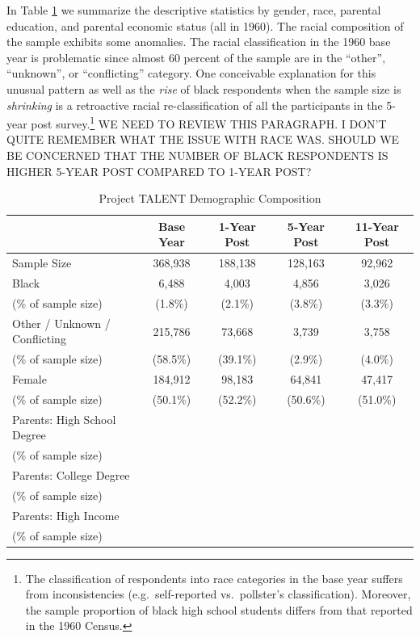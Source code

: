 \documentclass[onehalfspacing,11pt]{article}
\begin{document}
In Table \ref{tab:samplebywave} we summarize the descriptive statistics by gender, race, parental education, and parental economic status (all in 1960). The racial composition of the sample exhibits some anomalies. The racial classification in the 1960 base year is problematic since almost 60 percent of the sample are in the ``other'', ``unknown'', or ``conflicting'' category. One conceivable explanation for this unusual pattern as well as the {\it rise} of black respondents when the sample size is {\it shrinking} is a retroactive racial re-classification of all the participants in the 5-year post survey.\footnote{The classification of respondents into race categories in the base year suffers from inconsistencies (e.g.~self-reported vs.~pollster's classification). Moreover, the sample proportion of black high school students differs from that reported in the 1960 Census.} WE NEED TO REVIEW THIS PARAGRAPH. I DON'T QUITE REMEMBER WHAT THE ISSUE WITH RACE WAS. SHOULD WE BE CONCERNED THAT THE NUMBER OF BLACK RESPONDENTS IS HIGHER 5-YEAR POST COMPARED TO 1-YEAR POST?
\begin{table}[h!]
  \centering 
  \begin{tabular}{lcccc}
\toprule
   & Base Year & 1-Year Post & 5-Year Post & 11-Year Post\\
   \midrule
Sample Size & 368,938 & 188,138 & 128,163 & 92,962 \\
\midrule
Black   & 6,488 & 4,003 & 4,856 & 3,026 \\

\quad (\% of sample size) & (1.8\%) & (2.1\%) & (3.8\%) & (3.3\%) \\
%
\midrule
Other / Unknown / Conflicting & 215,786 & 73,668 & 3,739 & 3,758 \\
\quad (\% of sample size) & (58.5\%) & (39.1\%) & (2.9\%) & (4.0\%) \\
\midrule
Female   & 184,912 & 98,183 & 64,841 & 47,417 \\
\quad (\% of sample size) & (50.1\%) & (52.2\%) & (50.6\%) & (51.0\%) \\
\midrule
Parents: High School Degree & & & & \\
\quad (\% of sample size) & & & & \\
\midrule
Parents: College Degree & & & & \\
\quad (\% of sample size) & & & & \\
\midrule
Parents: High Income & & & & \\
\quad (\% of sample size) & & & & \\
\midrule
\bottomrule
\end{tabular}

\caption{Project TALENT Demographic Composition}
\label{tab:samplebywave}
\end{table}
\end{document}
